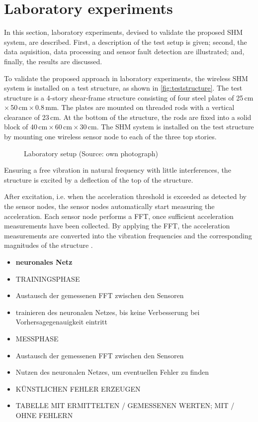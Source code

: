 \documentclass[12pt,a4paper]{scrartcl}
\begin{document}
\section*{Laboratory experiments}
In this section, laboratory experiments, devised to validate the proposed SHM system, are described.
First, a description of the test setup is given; second, the data aquisition, data processing and sensor fault detection are illustrated; and, finally, the results are discussed. 

To validate the proposed approach in laboratory experiments, the wireless SHM system is installed on a test structure, as shown in \autoref{fig:teststructure}.
The test structure is a 4-story shear-frame structure consisting of four steel plates of 25\,cm\,$\times$\,50\,cm\,$\times$\,0.8\,mm.
The plates are mounted on threaded rods with a vertical clearance of 23\,cm.
At the bottom of the structure, the rods are fixed into a solid block of 40\,cm\,$\times$\,60\,cm\,$\times$\,30\,cm.
The SHM system is installed on the test structure by mounting one wireless sensor node to each of the three top stories.

\begin{figure}
\centering
\setlength\fboxsep{1.5em}
\caption{Laboratory setup (Source: own photograph)}
\label{fig:teststructure}
\end{figure}

Ensuring a free vibration in natural frequency with little interferences, the structure is excited by a deflection of the top of the structure.

After excitation, i.e. when the acceleration threshold is exceeded as detected by the sensor nodes, the sensor nodes automatically start measuring the acceleration.
Each sensor node performs a FFT, once sufficient acceleration measurements have been collected.
By applying the FFT, the acceleration measurements are converted into the vibration frequencies and the corresponding magnitudes of the structure \cite{rao2011fast}.

\begin{itemize}
\item \textbf{neuronales Netz}
\item TRAININGSPHASE
\item Austausch der gemessenen FFT zwischen den Sensoren
\item trainieren des neuronalen Netzes, bis keine Verbesserung bei Vorhersagegenauigkeit eintritt
\item MESSPHASE
\item Austausch der gemessenen FFT zwischen den Sensoren
\item Nutzen des neuronalen Netzes, um eventuellen Fehler zu finden
\item KÜNSTLICHEN FEHLER ERZEUGEN
\item TABELLE MIT ERMITTELTEN / GEMESSENEN WERTEN; MIT / OHNE FEHLERN
\end{itemize}
\end{document}
